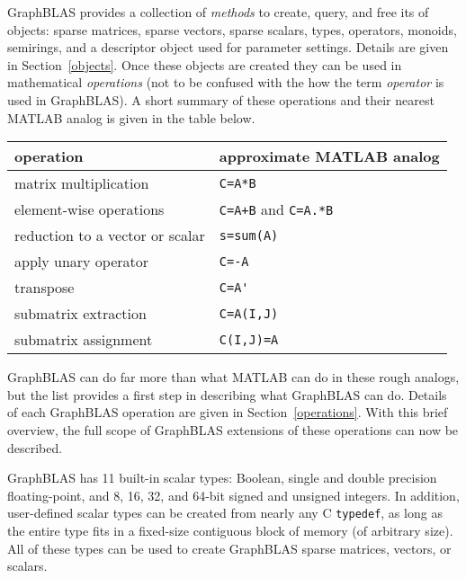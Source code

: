 \documentclass[12pt]{article}
\begin{document}
GraphBLAS provides a collection of {\em methods} to create, query, and free its
of objects: sparse matrices, sparse vectors, sparse scalars, types, operators,
monoids, semirings, and a descriptor object used for parameter settings.
Details are given in Section~\ref{objects}.  Once these objects are created
they can be used in mathematical {\em operations} (not to be confused with the
how the term {\em operator} is used in GraphBLAS).  A short summary of these
operations and their nearest MATLAB analog is given in the table below.

\begin{tabular}{ll}
operation                           & approximate MATLAB analog \\
\hline
matrix multiplication               & \verb'C=A*B' \\
element-wise operations             & \verb'C=A+B' and \verb'C=A.*B' \\
reduction to a vector or scalar     & \verb's=sum(A)' \\
apply unary operator                & \verb'C=-A' \\
transpose                           & \verb"C=A'" \\
submatrix extraction                & \verb'C=A(I,J)' \\
submatrix assignment                & \verb'C(I,J)=A' \\
\hline
\end{tabular}
\vspace{0.1in}

GraphBLAS can do far more than what MATLAB can do in these rough analogs, but
the list provides a first step in describing what GraphBLAS can do.  Details of
each GraphBLAS operation are given in Section~\ref{operations}.  With this
brief overview, the full scope of GraphBLAS extensions of these operations can
now be described.

GraphBLAS has 11 built-in scalar types: Boolean, single and double precision
floating-point, and 8, 16, 32, and 64-bit signed and unsigned integers.  In
addition, user-defined scalar types can be created from nearly any C
\verb'typedef', as long as the entire type fits in a fixed-size contiguous
block of memory (of arbitrary size).  All of these types can be used to create
GraphBLAS sparse matrices, vectors, or scalars.
\end{document}
